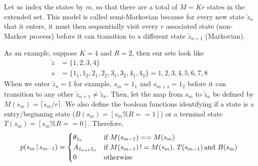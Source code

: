 \documentclass[11pt]{article}
\begin{document}
\begin{enumerate}[label=(\alph*)]
    \begin{solution}
    Let us index the states by $m$, so that there are a total of $M = Kr$ states in the extended set.
    This model is called semi-Markovian because for every new state $\tilde{z}_n$ that it enters,
    it must then sequentially visit every $r$ associated state (non-Markov process)
    before it can transition to a different state $\tilde{z}_{n+1}$ (Markovian).
    
    As an example, suppose $K = 4$ and $R = 2$, then our sets look like
    \begin{align*}
        \tilde{z} &= \{1, 2, 3, 4\} \\
        s &= \{1_1,1_2,2_1,2_2, 3_1, 3_2, 4_1, 4_2\} = {1, 2, 3, 4, 5, 6, 7, 8}
    \end{align*}
    When we enter $\tilde{z}_n=1$ for example, $s_m = 1_1$ and $s_{m+1}=1_2$ before it can transition to any other $\tilde{z}_{n+1}\neq\tilde{z}_{n}$. 
    Then, let the map from $s_m$ to $\tilde{z}_n$ be defined by $M(s_m) = \lceil s_m/r \rceil$.
    We also define the boolean functions identifying if a state is a entry/beginning state ($B(s_m) = [s_m\% R == 1]$) or a terminal state $T(s_m) = [s_m\% R == 0]$. Therefore,
    \begin{align*}
        p(s_m \,|\, s_{m-1}) = \begin{cases}
                \theta_{\tilde{z}_n} & \textrm{if } M(s_{m-1}) == M(s_m)\\
                A_{\tilde{z}_{n+1}{\tilde{z}_n}}
                    & \textrm{if } M(s_{m-1})\, != M(s_m),\, T(s_{m-1})\, \textrm{and } B(s_m)\\
                0   & \textrm{otherwise}
            \end{cases}
    \end{align*}

    \end{solution}
    
\end{enumerate}
\end{document}
